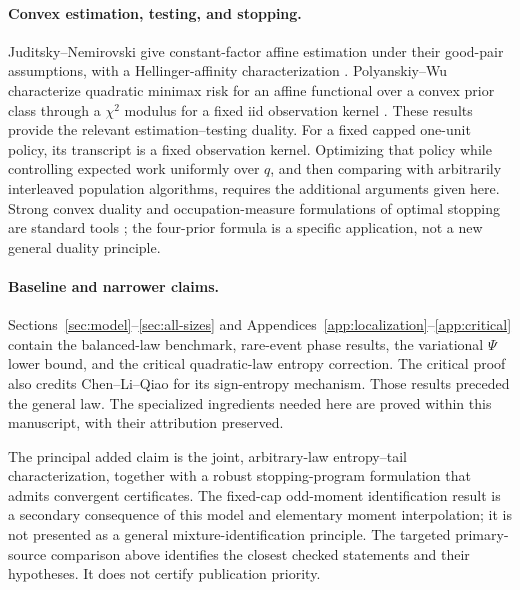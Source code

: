 \paragraph{Convex estimation, testing, and stopping.}
Juditsky--Nemirovski give constant-factor affine estimation under their
good-pair assumptions, with a Hellinger-affinity characterization
\cite[Theorem~3.1 and Proposition~3.1]{jn}. Polyanskiy--Wu characterize
quadratic minimax risk for an affine functional over a convex prior
class through a $\chi^2$ modulus for a fixed iid observation kernel
\cite[Theorem~1]{pw}. These results provide the relevant
estimation--testing duality. For a fixed capped one-unit policy, its
transcript is a fixed observation kernel. Optimizing that policy while
controlling expected work uniformly over $q$, and then comparing with
arbitrarily interleaved population algorithms, requires the additional
arguments given here. Strong convex duality and occupation-measure
formulations of optimal stopping are standard tools \cite{bv,cs}; the
four-prior formula is a specific application, not a new general duality
principle.

\paragraph{Baseline and narrower claims.}
Sections~\ref{sec:model}--\ref{sec:all-sizes} and
Appendices~\ref{app:localization}--\ref{app:critical} contain the
balanced-law benchmark, rare-event phase results, the variational $\Psi$
lower bound, and the critical quadratic-law entropy correction. The
critical proof also credits Chen--Li--Qiao for its sign-entropy mechanism.
Those results preceded the general law. The specialized ingredients
needed here are proved within this manuscript, with their attribution
preserved.

The principal added claim is the joint, arbitrary-law entropy--tail
characterization, together with a robust stopping-program formulation
that admits convergent certificates. The fixed-cap odd-moment
identification result is a secondary consequence of this model and
elementary moment interpolation; it is not presented as a general
mixture-identification principle. The targeted primary-source comparison
above identifies the closest checked statements and their hypotheses.
It does not certify publication priority.
